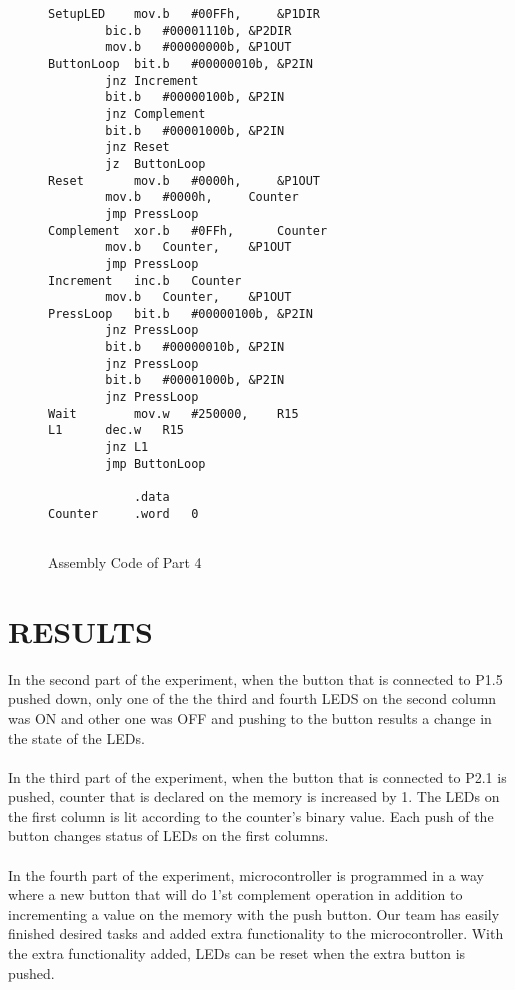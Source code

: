 \documentclass[pdftex,12pt,a4paper]{article}
\begin{document}
\newline{}

\begin{figure}[H]
    \centering
\begin{lstlisting}[language={[x86masm]Assembler}, label={code:part4}, caption={}]
SetupLED	mov.b	#00FFh,		&P1DIR
		bic.b	#00001110b,	&P2DIR
		mov.b	#00000000b,	&P1OUT
ButtonLoop	bit.b	#00000010b,	&P2IN
		jnz	Increment
		bit.b	#00000100b,	&P2IN
		jnz	Complement
		bit.b	#00001000b,	&P2IN
		jnz	Reset
		jz	ButtonLoop
Reset		mov.b	#0000h,		&P1OUT
		mov.b	#0000h,		Counter
		jmp	PressLoop
Complement	xor.b	#0FFh,		Counter
		mov.b	Counter,	&P1OUT
		jmp	PressLoop
Increment	inc.b	Counter
		mov.b	Counter,	&P1OUT
PressLoop	bit.b	#00000100b,	&P2IN
		jnz	PressLoop
		bit.b	#00000010b,	&P2IN
		jnz	PressLoop
		bit.b	#00001000b,	&P2IN
		jnz	PressLoop
Wait		mov.w	#250000,	R15
L1		dec.w	R15
		jnz	L1
		jmp	ButtonLoop

			.data
Counter		.word	0
	 
\end{lstlisting}
    \caption{Assembly Code of Part 4}
    \label{code:part4}
\end{figure}


\section{RESULTS}%
In the second part of the experiment, when the button that is connected to P1.5 pushed down, only one of the the third and fourth LEDS on the second column was ON and other one was OFF and pushing to the button results a change in the state of the LEDs.

\paragraph{}
In the third part of the experiment, when the button that is connected to P2.1 is pushed, counter that is declared on the memory is increased by 1. The LEDs on the first column is lit according to the counter's binary value. Each push of the button changes status of LEDs on the first columns.
\paragraph{}
In the fourth part of the experiment, microcontroller is programmed in a way where a new button that will do 1'st complement operation in addition to incrementing a value on the memory with the push button. Our team has easily finished desired tasks and added extra functionality to the microcontroller. With the extra functionality added, LEDs can be reset when the extra button is pushed. 
\end{document}
